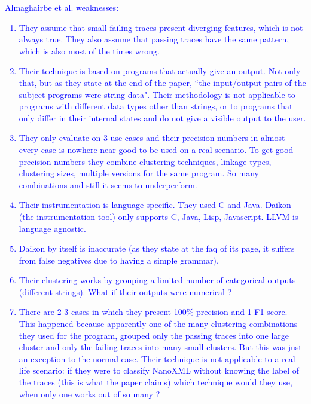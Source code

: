 
\textcolor{blue}{Almaghairbe et al. weaknesses:
\begin{enumerate}
	\item They assume that small failing traces present diverging features, which is not always true. They also assume that passing traces have the same pattern, which is also most of the times wrong.
	\item Their technique is based on programs that actually give an output. Not only that, but as they state at the end of the paper, ``the input/output pairs of the subject programs were string data". Their methodology is not applicable to programs with different data types other than strings, or to programs that only differ in their internal states and do not give a visible output to the user.
	\item They only evaluate on 3 use cases and their precision numbers in almost every case is nowhere near good to be used on a real scenario. To get good precision numbers they combine clustering techniques, linkage types, clustering sizes, multiple versions for the same program. So many combinations and still it seems to underperform.
	\item Their instrumentation is language specific. They used C and Java. Daikon (the instrumentation tool) only supports C, Java, Lisp, Javascript. LLVM is language agnostic.
	\item Daikon by itself is inaccurate (as they state at the faq of its page, it suffers from false negatives due to having a simple grammar).
	\item Their clustering works by grouping a limited number of categorical outputs (different strings). What if their outputs were numerical ?
	\item There are 2-3 cases in which they present 100\% precision and 1 F1 score. This happened because apparently one of the many clustering combinations they used for the program, grouped only the passing traces into one large cluster and only the failing traces into many small clusters. But this was just an exception to the normal case. Their technique is not applicable to a real life scenario: if they were to classify NanoXML without knowing the label of the traces (this is what the paper claims) which technique would they use, when only one works out of so many ?
\end{enumerate}}

\fi

